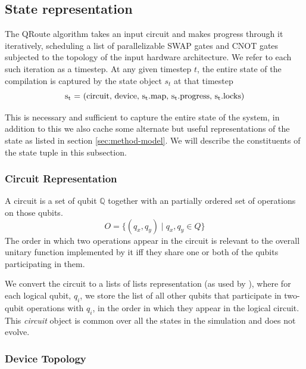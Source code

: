 \documentclass[%
 reprint,
 longbibliography,
 amsmath,amssymb,
 aps,
]{revtex4-2}
\begin{document}
\subsection{\label{sec:method-state}State representation}

The QRoute algorithm takes an input circuit and makes progress through it iteratively, scheduling a list of parallelizable SWAP gates and CNOT gates subjected to the topology of the input hardware architecture. We refer to each such iteration as a timestep. At any given timestep $t$, the entire state of the compilation is captured by the state object $s_t$ at that timestep 
\begin{equation}
    \textrm{s\textsubscript{t} = (circuit, device, s\textsubscript{t}.map, s\textsubscript{t}.progress, s\textsubscript{t}.locks)}
\end{equation}

This is necessary and sufficient to capture the entire state of the system, in addition to this we also cache some alternate but useful representations of the state as listed in section \ref{sec:method-model}. We will describe the constituents of the state tuple in this subsection.

\subsubsection{\label{sec:method-state-circuit}Circuit Representation}

A circuit is a set of qubit $\mathbb{Q}$ together with an partially ordered set of operations on those qubits. 
\begin{equation}
    O = \{(q_x, q_y) \mid q_x, q_y \in Q\}
\end{equation}
The order in which two operations appear in the circuit is relevant to the overall unitary function implemented by it iff they share one or both of the qubits participating in them.

We convert the circuit to a lists of lists representation (as used by \citet{qroute_dqn2}), where for each logical qubit, $q_i$, we store the list of all other qubits that participate in two-qubit operations with $q_i$, in the order in which they appear in the logical circuit. 
This \textit{circuit} object is common over all the states in the simulation and does not evolve.

\subsubsection{\label{sec:method-state-device}Device Topology}
\end{document}
